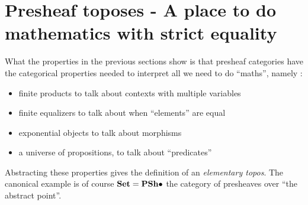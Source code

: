 \documentclass{article}
\begin{document}
\section{Presheaf toposes - A place to do mathematics with strict equality}

\begin{rmk}
  
  What the properties in the previous sections show is that
  presheaf categories have the categorical properties
  needed to interpret all we need to do ``maths'', 
  namely : 
  \begin{itemize}
    \item finite products to talk about contexts with multiple variables
    \item finite equalizers to talk about when ``elements'' are equal
    \item exponential objects to talk about morphisms
    \item a universe of propositions, to talk about ``predicates''
  \end{itemize}
  Abstracting these properties
  gives the definition of an \emph{elementary topos}.
  The canonical example is of course $\mathbf{Set} = \mathbf{PSh}\bullet$
  the category of presheaves over ``the abstract point''.
  
\end{rmk}


\end{document}
